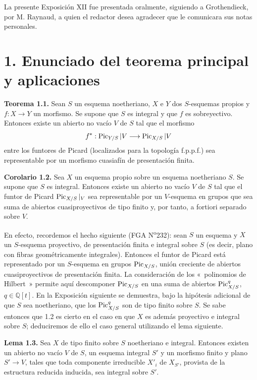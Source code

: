 La presente Exposición XII fue presentada oralmente, siguiendo a Grothendieck,
por M. Raynaud, a quien el redactor desea agradecer que le comunicara sus
notas personales.

\section*{1. Enunciado del teorema principal y aplicaciones}

\textbf{Teorema 1.1.} Sean \(S\) un esquema noetheriano, \(X\) e \(Y\) dos
\(S\)-esquemas propios y \(f:X\to Y\) un morfismo. Se supone que \(S\) es
integral y que \(f\) es sobreyectivo. Entonces existe un abierto no vacío
\(V\) de \(S\) tal que el morfismo
\[
  f^*:\operatorname{Pic}_{Y/S}|V\longrightarrow \operatorname{Pic}_{X/S}|V
\]
entre los funtores de Picard (localizados para la topología f.p.p.f.) sea
representable por un morfismo cuasiafín de presentación finita.

\textbf{Corolario 1.2.} Sea \(X\) un esquema propio sobre un esquema
noetheriano \(S\). Se supone que \(S\) es integral. Entonces existe un abierto
no vacío \(V\) de \(S\) tal que el funtor de Picard \(\operatorname{Pic}_{X/S}|_V\) sea
representable por un \(V\)-esquema en grupos que sea suma de abiertos
cuasiproyectivos de tipo finito y, por tanto, a fortiori separado sobre
\(V\).

En efecto, recordemos el hecho siguiente (FGA N\textsuperscript{o}232): sean
\(S\) un esquema y \(X\) un \(S\)-esquema proyectivo, de presentación finita
e integral sobre \(S\) (es decir, plano con fibras geométricamente
integrales). Entonces el funtor de Picard está representado por un
\(S\)-esquema en grupos \(\operatorname{Pic}_{X/S}\), unión creciente de abiertos
cuasiproyectivos de presentación finita. La consideración de los
«~polinomios de Hilbert~» permite aquí descomponer \(\operatorname{Pic}_{X/S}\) en una
suma de abiertos \(\operatorname{Pic}^q_{X/S}\), \(q\in\mathbb Q[t]\). En la Exposición
siguiente se demuestra, bajo la hipótesis adicional de que \(S\) sea
noetheriano, que los \(\operatorname{Pic}^q_{X/S}\) son de tipo finito sobre \(S\). Se sabe
entonces que 1.2 es cierto en el caso en que \(X\) es además proyectivo e
integral sobre \(S\); deduciremos de ello el caso general utilizando el lema
siguiente.

\textbf{Lema 1.3.} Sea \(X\) de tipo finito sobre \(S\) noetheriano e
integral. Entonces existen un abierto no vacío \(V\) de \(S\), un esquema
integral \(S'\) y un morfismo finito y plano \(S'\to V\), tales que toda
componente irreducible \(X'_i\) de \(X_{S'}\), provista de la estructura
reducida inducida, sea integral sobre \(S'\).

